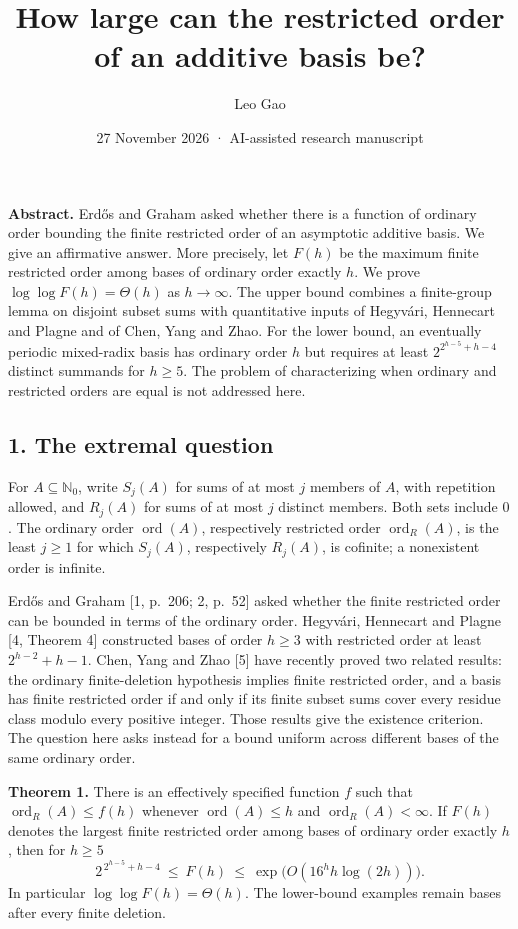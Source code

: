 \documentclass[
  11pt,
]{article}
\title{How large can the restricted order of an additive basis be?}
\author{Leo Gao}
\date{27 November 2026 · AI-assisted research manuscript}
\begin{document}
\maketitle

\textbf{Abstract.} Erdős and Graham asked whether there is a function of
ordinary order bounding the finite restricted order of an asymptotic
additive basis. We give an affirmative answer. More precisely, let
\(F(h)\) be the maximum finite restricted order among bases of ordinary
order exactly \(h\). We prove \(\log\log F(h)=\Theta(h)\) as
\(h\to\infty\). The upper bound combines a finite-group lemma on
disjoint subset sums with quantitative inputs of Hegyvári, Hennecart and
Plagne and of Chen, Yang and Zhao. For the lower bound, an eventually
periodic mixed-radix basis has ordinary order \(h\) but requires at
least \(2^{2^{h-5}+h-4}\) distinct summands for \(h\ge5\). The problem
of characterizing when ordinary and restricted orders are equal is not
addressed here.

\subsection{1. The extremal question}\label{the-extremal-question}

For \(A\subseteq\mathbb N_0\), write \(S_j(A)\) for sums of at most
\(j\) members of \(A\), with repetition allowed, and \(R_j(A)\) for sums
of at most \(j\) distinct members. Both sets include \(0\). The ordinary
order \(\operatorname{ord}(A)\), respectively restricted order
\(\operatorname{ord}_R(A)\), is the least \(j\ge1\) for which
\(S_j(A)\), respectively \(R_j(A)\), is cofinite; a nonexistent order is
infinite.

Erdős and Graham {[}1, p.~206; 2, p.~52{]} asked whether the finite
restricted order can be bounded in terms of the ordinary order.
Hegyvári, Hennecart and Plagne {[}4, Theorem 4{]} constructed bases of
order \(h\ge3\) with restricted order at least \(2^{h-2}+h-1\). Chen,
Yang and Zhao {[}5{]} have recently proved two related results: the
ordinary finite-deletion hypothesis implies finite restricted order, and
a basis has finite restricted order if and only if its finite subset
sums cover every residue class modulo every positive integer. Those
results give the existence criterion. The question here asks instead for
a bound uniform across different bases of the same ordinary order.

\textbf{Theorem 1.} There is an effectively specified function \(f\)
such that \(\operatorname{ord}_R(A)\le f(h)\) whenever
\(\operatorname{ord}(A)\le h\) and \(\operatorname{ord}_R(A)<\infty\).
If \(F(h)\) denotes the largest finite restricted order among bases of
ordinary order exactly \(h\), then for \(h\ge5\) \[
2^{\,2^{h-5}+h-4}\ \le\ F(h)\ \le\ \exp\!\bigl(O(16^h h\log(2h))\bigr).
\] In particular \(\log\log F(h)=\Theta(h)\). The lower-bound examples
remain bases after every finite deletion.
\end{document}
